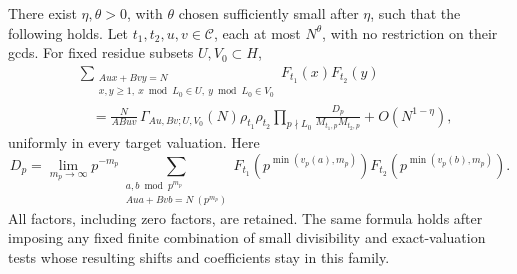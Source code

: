 \begin{proposition}\label{prop:older-weighted}
There exist \(\eta,\theta>0\), with \(\theta\) chosen sufficiently
small after \(\eta\), such that the following holds.
Let \(t_1,t_2,u,v\in\mathcal C\), each at most \(N^\theta\), with
no restriction on their gcds.  For fixed residue subsets \(U,V_0\subset H\),
\begin{align*}
 &\sum_{\substack{Au x+Bv y=N\\x,y\ge1,\ x\bmod L_0\in U,\ y\bmod L_0\in V_0}}
                      F_{t_1}(x)F_{t_2}(y)\\
 &\quad=\frac{N}{ABuv}\,
       \Gamma_{Au,Bv;U,V_0}(N)\rho_{t_1}\rho_{t_2}
       \prod_{p\nmid L_0}\frac{D_p}{M_{t_1,p}M_{t_2,p}}
                         +O(N^{1-\eta}),
\end{align*}
uniformly in every target valuation.  Here
\[
 D_p=\lim_{m_p\to\infty}p^{-m_p}
 \sum_{\substack{a,b\bmod p^{m_p}\\Au a+Bv b=N\ (p^{m_p})}}
       F_{t_1}(p^{\min(v_p(a),m_p)})
       F_{t_2}(p^{\min(v_p(b),m_p)}).
\]
All factors, including zero factors, are retained.
The same formula holds after imposing any fixed finite combination
of small divisibility and exact-valuation tests whose resulting
shifts and coefficients stay in this family.
\end{proposition}

